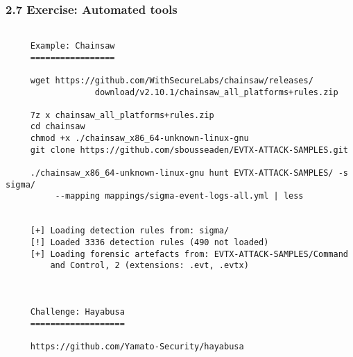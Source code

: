 \begin{frame}[fragile]
	\frametitle{2.7 Exercise: Automated tools}
  \begin{lstlisting}[basicstyle=\tiny]

     Example: Chainsaw
     =================
     
     wget https://github.com/WithSecureLabs/chainsaw/releases/
                  download/v2.10.1/chainsaw_all_platforms+rules.zip

     7z x chainsaw_all_platforms+rules.zip
     cd chainsaw
     chmod +x ./chainsaw_x86_64-unknown-linux-gnu
     git clone https://github.com/sbousseaden/EVTX-ATTACK-SAMPLES.git 

     ./chainsaw_x86_64-unknown-linux-gnu hunt EVTX-ATTACK-SAMPLES/ -s sigma/
          --mapping mappings/sigma-event-logs-all.yml | less


     [+] Loading detection rules from: sigma/
     [!] Loaded 3336 detection rules (490 not loaded)
     [+] Loading forensic artefacts from: EVTX-ATTACK-SAMPLES/Command 
         and Control, 2 (extensions: .evt, .evtx)



     Challenge: Hayabusa
     ===================

     https://github.com/Yamato-Security/hayabusa
  \end{lstlisting}
\end{frame}




